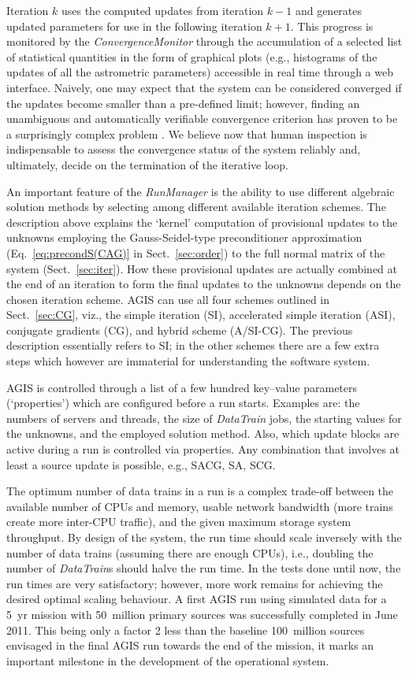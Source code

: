 \documentclass[structabstract]{aa}
\begin{document}
Iteration $k$ uses the computed updates from iteration $k-1$ and
generates updated parameters for use in the following iteration $k+1$.
This progress is monitored by the \emph{ConvergenceMonitor} through
the accumulation of a selected list of statistical quantities in the form of
graphical plots (e.g., histograms of the updates of all the astrometric parameters)
accessible in real time through a web interface. Naively, one may expect
that the system can be considered converged if the updates become
smaller than a pre-defined limit; however, finding an unambiguous
and automatically verifiable convergence criterion
has proven to be a surprisingly complex problem
\citep[see Sect.~4.4 in][]{bombrun+10}.
We believe now that human inspection is indispensable to assess the
convergence status of the system reliably and, ultimately, decide on
the termination of the iterative loop.

An important feature of the \emph{RunManager} is the ability to use different 
algebraic solution methods by selecting among different available iteration schemes. 
The description above explains the `kernel' computation of provisional updates 
to the unknowns employing
the Gauss-Seidel-type preconditioner approximation
(Eq.~\ref{eq:precondS(CAG)} in Sect.~\ref{sec:order})
to the full normal matrix of the system (Sect.~\ref{sec:iter}). How these 
provisional updates are actually combined at the end of an iteration to form 
the final updates to the unknowns depends on the chosen iteration scheme.
AGIS can use all four schemes outlined in Sect.~\ref{sec:CG}, viz., the  
simple iteration (SI), accelerated simple iteration (ASI), conjugate gradients (CG), 
and hybrid scheme (A/SI-CG). The previous description essentially refers to SI;
in the other schemes there are a few extra steps which however are immaterial 
for understanding the software system.

AGIS is controlled through a list of a few hundred key--value parameters
(`properties') which are configured before a run starts. Examples are:
the numbers of servers and threads, the size of \emph{DataTrain} jobs,
the starting values for the unknowns, and the employed solution method.
Also, which update blocks are active during a run is controlled
via properties. Any combination that involves at least a source update
is possible, e.g., SACG, SA, SCG.

The optimum number of data trains in a run is a complex trade-off between 
the available number of CPUs and memory, usable network bandwidth (more trains create
more inter-CPU traffic), and the given maximum storage system throughput.
By design of the system, the run time should scale inversely with the number of
data trains (assuming there are enough CPUs),
i.e., doubling the number of \emph{DataTrain}s should halve the run time.
In the tests done until now, the run times are very satisfactory;
however, more work remains for achieving the desired optimal scaling behaviour.
A first AGIS run using simulated data for a 5~yr mission with 50~million primary
sources was successfully completed in June 2011. This being only a factor 2 less than 
the baseline 100~million sources envisaged in the final AGIS run towards the
end of the mission, it marks an important
milestone in the development of the operational system.
\end{document}
